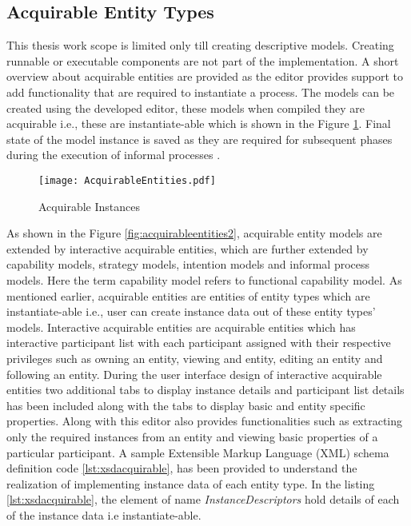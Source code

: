 \subsection{Acquirable Entity Types}
\label{sec:acquirableentities}
This thesis work scope is limited only till creating descriptive models. Creating runnable or executable components are not part of the implementation. A short overview about acquirable entities are provided as the editor provides support to add functionality that are required to instantiate a process. The models can be created using the developed editor, these models when compiled they are acquirable i.e., these are instantiate-able which is shown in the Figure \ref{fig:acquirableentities}. Final state of the model instance is saved as they are required for subsequent phases during the execution of informal processes \cite{Sungur2015}. 

\begin{figure}
	\centering
	\texttt{[image: AcquirableEntities.pdf]}
	\caption{Acquirable Instances}
	\label{fig:acquirableentities}
\end{figure}

As shown in the Figure \ref{fig:acquirableentities2}, acquirable entity models are extended by interactive acquirable entities, which are further extended by capability models, strategy models, intention models and informal process models. Here the term capability model refers to functional capability model. As mentioned earlier, acquirable entities are entities of entity types which are instantiate-able i.e., user can create instance data out of these entity types' models. Interactive acquirable entities are acquirable entities which has interactive participant list with each participant assigned with their respective privileges such as owning an entity, viewing and entity, editing an entity and following an entity. During the user interface design of interactive acquirable entities two additional tabs to display instance details and participant list details has been included along with the tabs to display basic and entity specific properties. Along with this editor also provides functionalities such as extracting only the required instances from an entity and viewing basic properties of a particular participant. A sample Extensible Markup Language (XML) schema definition code \ref{lst:xsdacquirable}, has been provided to understand the realization of implementing instance data of each entity type. In the listing \ref{lst:xsdacquirable}, the element of name \textit{InstanceDescriptors} hold details of each of the instance data i.e instantiate-able. 

